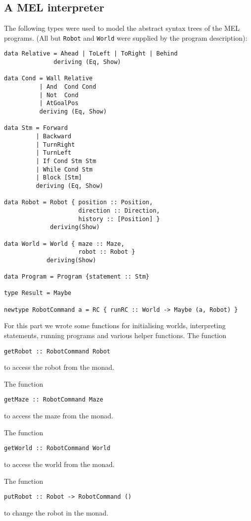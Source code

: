 \documentclass[a4paper,10pt]{article}
\begin{document}
\subsection{A MEL interpreter}

The following types were used to model the abstract syntax trees of the MEL programs. (All but \verb=Robot= and \verb=World= were supplied by the program description):
\begin{verbatim}
data Relative = Ahead | ToLeft | ToRight | Behind
              deriving (Eq, Show)

data Cond = Wall Relative
          | And  Cond Cond
          | Not  Cond
          | AtGoalPos
          deriving (Eq, Show)
            
data Stm = Forward
         | Backward
         | TurnRight
         | TurnLeft    
         | If Cond Stm Stm
         | While Cond Stm
         | Block [Stm]
         deriving (Eq, Show)

data Robot = Robot { position :: Position,
                     direction :: Direction,
                     history :: [Position] }
             deriving(Show)
             
data World = World { maze :: Maze,
                     robot :: Robot }
            deriving(Show)

data Program = Program {statement :: Stm}

type Result = Maybe

newtype RobotCommand a = RC { runRC :: World -> Maybe (a, Robot) }
\end{verbatim}
For this part we wrote some functions for initialising worlds, interpreting statements, running programs and various helper functions. The function
\begin{verbatim}
getRobot :: RobotCommand Robot
\end{verbatim}
to access the robot from the monad.

The function
\begin{verbatim}
getMaze :: RobotCommand Maze
\end{verbatim}
to access the maze from the monad.

The function
\begin{verbatim}
getWorld :: RobotCommand World
\end{verbatim}
to access the world from the monad.

The function
\begin{verbatim}
putRobot :: Robot -> RobotCommand ()
\end{verbatim}
to change the robot in the monad.
\end{document}
